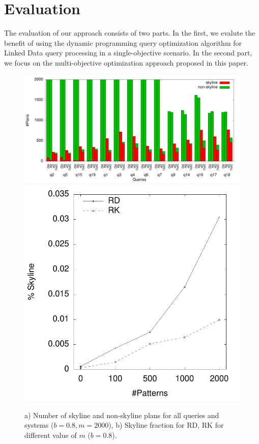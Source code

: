 \section{Evaluation}
\label{sec:eva}


The evaluation of our approach consists of two parts. In the first, we
evalute the benefit of using the dynamic programming query
optimization algorithm for Linked Data query processing in a
single-objective scenario. In the second part, we focus on the
multi-objective optimization approach proposed in this paper.









\begin{figure}[htb]
  \centering
  \includegraphics[width=0.7\linewidth]{figs/all_queries.pdf}
  \includegraphics[width=0.29\linewidth]{figs/plans_skyline_by_m.pdf}
  \caption{a) Number of skyline and non-skyline plans for all queries
    and systems ($b=0.8, m=2000$), b) Skyline fraction for RD, RK for
    different value of $m$ ($b=0.8$).}
  \label{fig:queries}
\end{figure}

